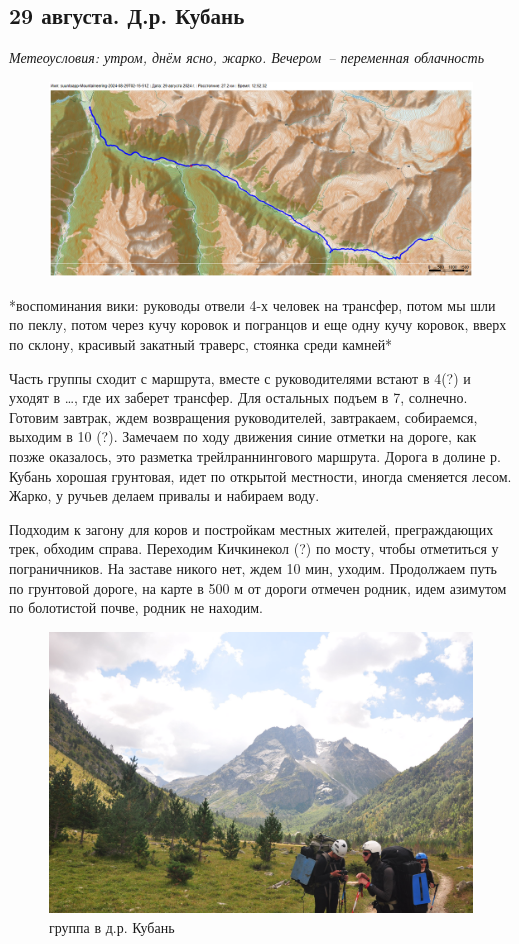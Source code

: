 \subsection{29 августа. Д.р. Кубань}
\textit{Метеоусловия: утром, днём ясно, жарко. Вечером~-- переменная облачность}

\begin{figure}[h!]
	\centering
	\includegraphics[angle=0, width=0.7\linewidth]{../pics/mini_maps/29}
	\label{fig:mini_29}
\end{figure}

*воспоминания вики: руководы отвели 4-х человек на трансфер, потом мы шли по пеклу, потом через кучу коровок и погранцов и еще одну кучу коровок, вверх по склону, красивый закатный траверс, стоянка среди камней*


Часть группы сходит с маршрута, вместе с руководителями встают в 4(?) и уходят в …, где их заберет трансфер. Для остальных подъем в 7, солнечно. Готовим завтрак, ждем возвращения руководителей, завтракаем, собираемся, выходим в 10 (?). Замечаем по ходу движения синие отметки на дороге, как позже оказалось, это разметка трейлраннингового маршрута.
Дорога в долине р. Кубань хорошая грунтовая, идет по открытой местности, иногда сменяется лесом. Жарко, у ручьев делаем привалы и набираем воду.

Подходим к загону для коров и постройкам местных жителей, преграждающих трек, обходим справа.
Переходим Кичкинекол (?) по мосту, чтобы отметиться у пограничников. На заставе никого нет, ждем 10 мин, уходим.
Продолжаем путь по грунтовой дороге, на карте в 500 м от дороги отмечен родник, идем азимутом по болотистой почве, родник не находим.

\begin{figure}[h!]
	\centering
	\includegraphics[width=0.7\linewidth]{../pics/DSC_0462 2.JPG}
	\caption{группа в д.р. Кубань}
	\label{fig:DSC_0462 2.JPG}
\end{figure}

